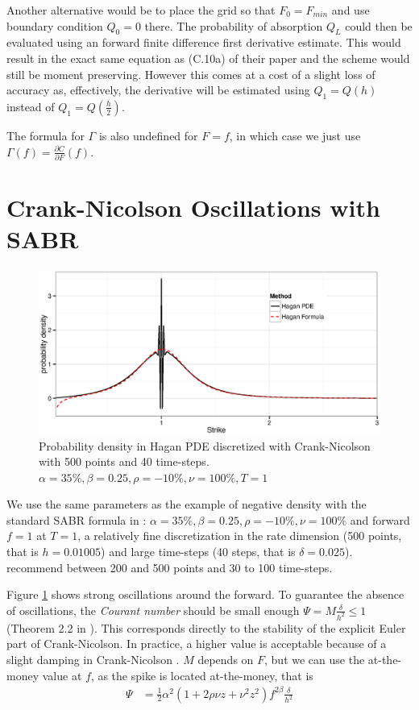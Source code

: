\documentclass[]{rAMF2e}
\begin{document}
Another alternative would be to place the grid so that $F_0 = F_{min}$ and use boundary condition $Q_0 = 0$ there. The probability of absorption $Q_L$ could then be evaluated using an forward finite difference first derivative estimate. This would result in the exact same equation as (C.10a) of their paper and the scheme would still be moment preserving. However this comes at a cost of a slight loss of accuracy as, effectively, the derivative will be estimated using $Q_1 = Q(h)$ instead of $Q_1 = Q(\frac{h}{2})$.

The formula for $\Gamma$ is also undefined for $F=f$, in which case we just use $\Gamma(f) = \frac{\partial C}{\partial F}(f)$.

\section{Crank-Nicolson Oscillations with SABR}\label{section_cn}
\begin{figure}[htb]
  \begin{center}  
    \includegraphics[width=12cm]{density_hagan_cn_500_40.eps}
  \end{center}
     \caption{\label{fig:density_hagan_cn_500_40} Probability density in Hagan PDE discretized with Crank-Nicolson with 500 points and 40 time-steps. $\alpha=35\%, \beta=0.25, \rho=-10\%, \nu=100\%, T=1$}
\end{figure}

We use the same parameters as the example of negative density with the standard SABR formula in \citep{hagan2013arbitrage}: $\alpha=35\%, \beta=0.25, \rho=-10\%, \nu=100\%$ and forward $f=1$ at $T=1$, a relatively fine discretization in the rate dimension (500 points, that is $h = 0.01005$) and large time-steps (40 steps, that is $\delta=0.025$). \cite{hagan2013arbitrage} recommend between 200 and 500 points and 30 to 100 time-steps.

Figure \ref{fig:density_hagan_cn_500_40} shows strong oscillations around the forward. To guarantee the absence of oscillations, the \emph{Courant number}  should be small enough $\Psi = M \frac{\delta}{h^2}\leq 1$ (Theorem 2.2 in \cite{morton2005numerical}). This corresponds directly to the stability of the explicit Euler part of Crank-Nicolson. In practice, a higher value is acceptable because of a slight damping in Crank-Nicolson \citep{lawson1978extrapolation}. $M$ depends on $F$, but we can use the at-the-money value at $f$, as the spike is located at-the-money, that is 
\begin{align}
\Psi &= \frac{1}{2} \alpha^2 (1+2\rho\nu z+ \nu^2 z^2) f^{2\beta} \frac{\delta}{h^2}
\end{align} 
\end{document}
